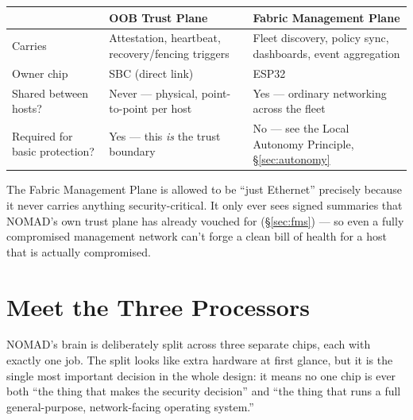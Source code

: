 \documentclass[11pt,a4paper]{article}
\begin{document}
\begin{center}
\renewcommand{\arraystretch}{1.3}
\begin{tabular}{@{}p{3.6cm}p{4.9cm}p{4.9cm}@{}}
\toprule
 & \textbf{OOB Trust Plane} & \textbf{Fabric Management Plane} \\
\midrule
Carries & Attestation, heartbeat, recovery/fencing triggers & Fleet discovery, policy sync, dashboards, event aggregation \\
Owner chip & SBC (direct link) & ESP32 \\
Shared between hosts? & Never --- physical, point-to-point per host & Yes --- ordinary networking across the fleet \\
Required for basic protection? & Yes --- this \emph{is} the trust boundary & No --- see the Local Autonomy Principle, \S\ref{sec:autonomy} \\
\bottomrule
\end{tabular}
\end{center}

\begin{plainbox}
The Fabric Management Plane is allowed to be ``just Ethernet'' precisely
because it never carries anything security-critical. It only ever sees
signed summaries that NOMAD's own trust plane has already vouched for
(\S\ref{sec:fms}) --- so even a fully compromised management network
can't forge a clean bill of health for a host that is actually
compromised.
\end{plainbox}

\section{Meet the Three Processors}
\label{sec:three-chips}

NOMAD's brain is deliberately split across three separate chips, each
with exactly one job. The split looks like extra hardware at first
glance, but it is the single most important decision in the whole
design: it means no one chip is ever both ``the thing that makes the
security decision'' and ``the thing that runs a full general-purpose,
network-facing operating system.''
\end{document}
